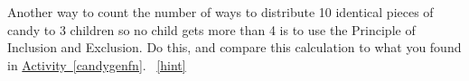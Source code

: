 \documentclass{book}
\begin{document}
\setcounter{project}{256}
\addtocounter{project}{-1}
\begin{activity}[]\label{activity-249}
\hypertarget{p-1394}{}%
Another way to count the number of ways to distribute 10 identical pieces of candy to 3 children so no child gets more than 4 is to use the Principle of Inclusion and Exclusion.  Do this, and compare this calculation to what you found in \hyperref[candygenfn]{Activity~\ref{candygenfn}}.%
~\hfill{\tiny\hyperlink{a-256}{[hint]}\hypertarget{q-256}{}}\end{activity}
\end{document}
